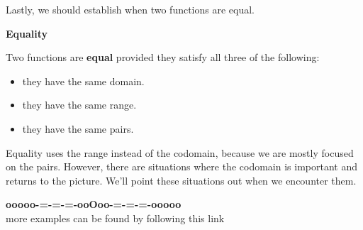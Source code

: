 \documentclass{ximera}
\begin{document}
Lastly, we should establish when two functions are equal. 





\begin{definition} \textbf{\textcolor{green!50!black}{Equality}}

Two functions are \textbf{equal} provided they satisfy all three of the following:

\begin{itemize}
\item they have the same domain.
\item they have the same range.
\item they have the same pairs.
\end{itemize}

\end{definition}
Equality uses the range instead of the codomain, because we are mostly focused on the pairs.  However, there are situations where the codomain is important and returns to the picture.  We'll point these situations out when we encounter them.











\begin{onlineOnly}
\begin{center}
\textbf{\textcolor{green!50!black}{ooooo-=-=-=-ooOoo-=-=-=-ooooo}} \\

more examples can be found by following this link\\ 

\end{center}
\end{onlineOnly}
\end{document}
